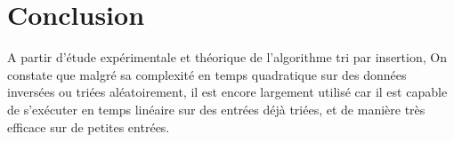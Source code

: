 \section{Conclusion}
A partir d'étude expérimentale et théorique de l'algorithme tri par insertion, On constate que malgré sa complexité en temps quadratique sur des données inversées ou triées aléatoirement, il est encore largement utilisé car il est capable de s'exécuter en temps linéaire sur des entrées déjà triées, et de manière très efficace sur de petites entrées.

